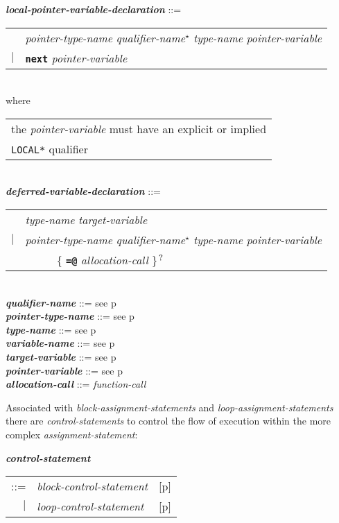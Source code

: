 \documentclass[12pt]{article}
\newcommand{\TT}[1]{{\tt \bfseries #1}}
\newcommand{\STAR}{{\Large $^\star$}}
\newcommand{\QMARK}{{$^{\,\mbox{\footnotesize ?}}$}}
\newcommand{\emkey}[1]{{\em \bfseries #1}}
\newcommand{\pagref}[1]{p\pageref{#1}}
\newenvironment{indpar}[1][0.3in]%
	{\begin{list}{}%
		     {\setlength{\itemsep}{0in}%
		      \setlength{\topsep}{0in}%
		      \setlength{\parsep}{1ex}%
		      \setlength{\labelwidth}{#1}%
		      \setlength{\leftmargin}{#1}%
		      \addtolength{\leftmargin}{\labelsep}}%
	 \item}%
	{\end{list}}
\begin{document}
\begin{indpar}
\emkey{local-pointer-variable-declaration}%
    \label{LOCAL-POINTER-VARIABLE-DECLARATION} ::= \\
\hspace*{0.5in}\begin{tabular}{rl}
	    & {\em pointer-type-name} {\em qualifier-name}\STAR{}
	      {\em type-name} {\em pointer-variable} \\
	$|$ & \TT{next} {\em pointer-variable}
	\end{tabular} \\
\hspace*{0.5in}where \begin{tabular}[t]{@{}l@{}}
               the {\em pointer-variable} must have an explicit or implied  \\
	       {\tt *LOCAL*} qualifier
	       \end{tabular}
\\[0.5ex]
\emkey{deferred-variable-declaration}%
    \label{DEFERRED-VARIABLE-DECLARATION} ::= \\
\hspace*{0.5in}\begin{tabular}{rl}
	    & {\em type-name} {\em target-variable} \\
	$|$ & {\em pointer-type-name} {\em qualifier-name}\STAR{}
	      {\em type-name} {\em pointer-variable} \\
	    & ~~~~~ \{ \TT{=@} {\em allocation-call} \}\QMARK{} \\
	\end{tabular}
\\[0.5ex]
\emkey{qualifier-name} ::= see \pagref{QUALIFIER-NAME}
\\[0.5ex]
\emkey{pointer-type-name} ::= see \pagref{POINTER-TYPE-NAME}
\\[0.5ex]
\emkey{type-name} ::= see \pagref{TYPE-NAME}
\\[0.5ex]
\emkey{variable-name} ::= see \pagref{VARIABLE-NAME}
\\[0.5ex]
\emkey{target-variable} ::= see \pagref{TARGET-VARIABLE}
\\[0.5ex]
\emkey{pointer-variable} ::= see \pagref{POINTER-VARIABLE}
\\[0.5ex]
\emkey{allocation-call} ::= {\em function-call}
\end{indpar}

Associated with {\em block-assignment-statements} and
{\em loop-assignment-statements}
there are {\em con\-trol-statements}
to control the flow of execution within the more complex
{\em assignment-state\-ment}:
\begin{indpar}
\emkey{control-statement}\label{CONTROL-STATEMENT}
    \begin{tabular}[t]{@{}rll}
    ::= & {\em block-control-statement}
        & [\pagref{BLOCK-CONTROL-STATEMENT}] \\
    $|$ & {\em loop-control-statement}
        & [\pagref{LOOP-CONTROL-STATEMENT}] \\
    \end{tabular}
\end{indpar}
\end{document}
